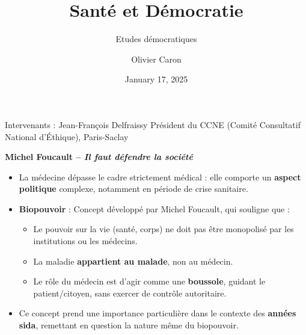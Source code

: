 \documentclass[
  ignorenonframetext,
]{beamer}
\title{Santé et Démocratie}
\subtitle{Etudes démocratiques}
\author{Olivier Caron}
\date{January 17, 2025}
\providecommand{\tightlist}{%
  \setlength{\itemsep}{0pt}\setlength{\parskip}{0pt}}\usepackage{longtable,booktabs,array}
\begin{document}
\frame{\titlepage}
\ifdefined\Shaded\renewenvironment{Shaded}{\begin{tcolorbox}[enhanced, interior hidden, breakable, borderline west={3pt}{0pt}{shadecolor}, frame hidden, sharp corners, boxrule=0pt]}{\end{tcolorbox}}\fi

\begin{frame}{Intervenants : Jean-François Delfraissy}
\protect\hypertarget{intervenants-jean-franuxe7ois-delfraissy}{}
Président du CCNE (Comité Consultatif National d'Éthique), Paris-Saclay
\end{frame}

\begin{frame}{\textbf{Michel Foucault -- \emph{Il faut défendre la
société}}}
\protect\hypertarget{michel-foucault-il-faut-duxe9fendre-la-sociuxe9tuxe9}{}
\begin{itemize}
\tightlist
\item
  La médecine dépasse le cadre strictement médical : elle comporte un
  \textbf{aspect politique} complexe, notamment en période de crise
  sanitaire.\\
\item
  \textbf{Biopouvoir} : Concept développé par Michel Foucault, qui
  souligne que :

  \begin{itemize}
  \tightlist
  \item
    Le pouvoir sur la vie (santé, corps) ne doit pas être monopolisé par
    les institutions ou les médecins.\\
  \item
    La maladie \textbf{appartient au malade}, non au médecin.\\
  \item
    Le rôle du médecin est d'agir comme une \textbf{boussole}, guidant
    le patient/citoyen, sans exercer de contrôle autoritaire.\\
  \end{itemize}
\item
  Ce concept prend une importance particulière dans le contexte des
  \textbf{années sida}, remettant en question la nature même du
  biopouvoir.
\end{itemize}
\end{frame}
\end{document}
